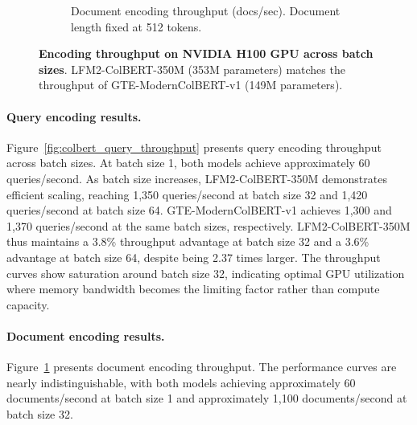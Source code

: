 \documentclass{article}
\begin{document}
\begin{figure}[htbp]
\begin{subfigure}[b]{0.48\textwidth}
        \caption{Document encoding throughput (docs/sec). Document length fixed at 512 tokens.}
        \label{fig:colbert_doc_throughput}
    \end{subfigure}
    \caption{\textbf{Encoding throughput on NVIDIA H100 GPU across batch sizes}. LFM2-ColBERT-350M (353M parameters) matches the throughput of GTE-ModernColBERT-v1 (149M parameters).}
    \label{fig:colbert_throughput}
\end{figure}

\paragraph{Query encoding results.}
Figure~\ref{fig:colbert_query_throughput} presents query encoding throughput across batch sizes. At batch size 1, both models achieve approximately 60 queries/second. As batch size increases, LFM2-ColBERT-350M demonstrates efficient scaling, reaching 1,350 queries/second at batch size 32 and 1,420 queries/second at batch size 64. GTE-ModernColBERT-v1 achieves 1,300 and 1,370 queries/second at the same batch sizes, respectively. LFM2-ColBERT-350M thus maintains a 3.8\% throughput advantage at batch size 32 and a 3.6\% advantage at batch size 64, despite being 2.37 times larger. The throughput curves show saturation around batch size 32, indicating optimal GPU utilization where memory bandwidth becomes the limiting factor rather than compute capacity.

\paragraph{Document encoding results.}
Figure~\ref{fig:colbert_doc_throughput} presents document encoding throughput. The performance curves are nearly indistinguishable, with both models achieving approximately 60 documents/second at batch size 1 and approximately 1,100 documents/second at batch size 32.
\end{document}
